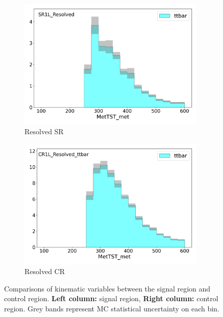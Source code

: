    \begin{figure}[htbp]
     \centering
      \begin{subfigure}{0.49\textwidth}
      \includegraphics[width = 0.98\textwidth]{Figures/4/CRSR/SR1L_Resolved/MetTST_met.png}
      \caption{Resolved SR \met}
      \end{subfigure}
      \begin{subfigure}{0.49\textwidth}
      \includegraphics[width = 0.98\textwidth]{Figures/4/CRSR/CR1L_Resolved_ttbar/MetTST_met.png}
      \caption{Resolved CR \met}
      \end{subfigure}


       \caption{Comparisons of kinematic variables between the \resolved signal region and \ttbar control region. \textbf{Left column:} signal region, \textbf{Right column:} control region. Grey bands represent MC statistical uncertainty on each bin.}
       \label{fig:CRSR_resolved}
    \end{figure}

